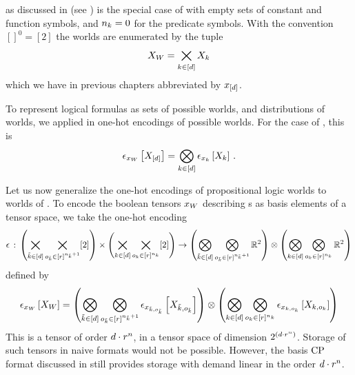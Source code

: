 
\PropositionalLogic{} as discussed in (see ) is the special case of \firstOrderLogic{} with empty sets of constant and function symbols, and $n_{k}=0$ for the predicate symbols.
With the convention $[]^{0}=[2]$ the worlds are enumerated by the tuple
\begin{align*}
    X_{W} = \bigtimes_{k\in[d]} X_{k}
\end{align*}
which we have in previous chapters abbreviated by $x_{[d]}$.


To represent logical formulas as sets of possible worlds, and distributions of worlds, we applied in  one-hot encodings of possible worlds.
For the case of \propositionalLogic{}, this is
\begin{align*}
    \epsilon_{x_{W}}\left[X_{[d]}\right]
    = \bigotimes_{k\in[d]} \epsilon_{x_{k}}\left[X_{k}\right] \, .
\end{align*}


Let us now generalize the one-hot encodings of propositional logic worlds to worlds of \firstOrderLogic{}.
To encode the boolean tensors $x_{W}$ describing \firstOrderLogic{}s as basis elements of a tensor space, we take the one-hot encoding
\begin{align*}
    \epsilon \,:\, \left(\bigtimes_{\tilde{k}\in[d]}\bigtimes_{o_{\tilde{k}}\in[r]^{n_{\tilde{k}}+1}}[2]\right) \times\left(\bigtimes_{k\in[d]}\bigtimes_{o_{k}\in[r]^{n_{k}}}[2]\right) \rightarrow \left(\bigotimes_{\tilde{k}\in[d]}\bigotimes_{o_{\tilde{k}}\in[r]^{n_{\tilde{k}}+1}}\mathbb{R}^2\right) \otimes\left(\bigotimes_{k\in[d]}\bigotimes_{o_{k}\in[r]^{n_{k}}}\mathbb{R}^2\right)
\end{align*}
defined by
\begin{align*}
    \epsilon_{x_{W}}\left[X_{W}\right]
    =
    \left(\bigotimes_{\tilde{k}\in[d]}\bigotimes_{o_{\tilde{k}}\in[r]^{n_{\tilde{k}}+1}}
        \epsilon_{x_{\tilde{k},o_{\tilde{k}}}}\left[X_{\tilde{k},o_{\tilde{k}}}\right]\right)
    \otimes\left(\bigotimes_{k\in[d]}\bigotimes_{o_{k}\in[r]^{n_{k}}}
        \epsilon_{x_{k,o_{k}}}\left[X_{k,o_{k}}\right] \right)
\end{align*}
This is a tensor of order $d\cdot r^{n}$, in a tensor space of dimension $2^{\left(d\cdot r^{n}\right)}$.
Storage of such tensors in naive formats would not be possible.
However, the basis $\mathrm{CP}$ format discussed in  still provides storage with demand linear in the order $d\cdot r^{n}$.


